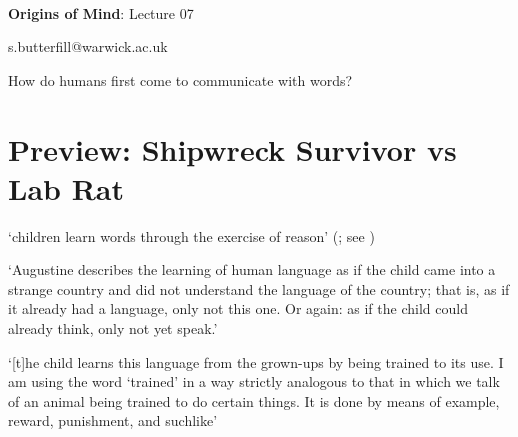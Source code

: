 \documentclass[12pt]{extarticle}
\date{}
\makeatletter
\def \ititle {Origins of Mind}
\def \isubtitle {Lecture 07}
\def \iemail{s.butterfill@warwick.ac.uk}
\makeatother
\begin{document}
\begin{multicols}{3}

\setlength\footnotesep{1em}







\def \ititle {Origins of Mind}
 
\def \isubtitle {Lecture 07}
 
 
 
\
 
 
 
\begin{center}
 
{\Large
 
\textbf{\ititle}: \isubtitle
 
}
 
 
 
\iemail %
 
\end{center}
 
 
 
How do humans first come to communicate with words?

 
 
 
\section{Preview: Shipwreck Survivor vs Lab Rat}
 
 
‘children learn words through the exercise of reason’ 
(\citealp[p.\ 1103]{Bloom:2001ka}; see \citealp{Bloom:2000qz})
 
‘Augustine describes the learning of human language as if the child came into a strange country and did not understand the language of the country; that is, as if it already had a language, only not this one.  Or again: as if the child could already think, only not yet speak.’
\citep[15--16, §32]{Wittgenstein:1953mm}
 
‘[t]he child learns this language from the grown-ups by being trained to its use. I am using the word ‘trained’ in a way strictly analogous to that in which we talk of an animal being trained to do certain things. It is done by means of example, reward, punishment, and suchlike’
\citep[p.\ 77]{Wittgenstein:1972lj}
 

\end{multicols}
\end{document}
